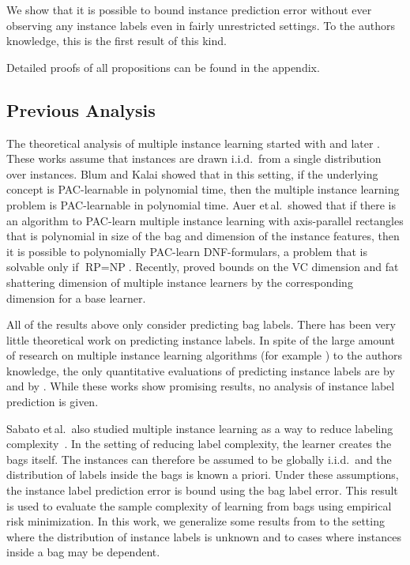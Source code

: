 We show that it is possible to bound instance prediction error without
ever observing any instance labels even in fairly unrestricted settings.
To the authors knowledge, this is the first result of this kind.

Detailed proofs of all propositions can be found in the appendix.

\subsection{Previous Analysis}
The theoretical analysis of multiple instance learning started with \citet{auer1997approximating} and later \citet{blum1998note}.
These works assume that instances are drawn i.i.d.\ from a single distribution over instances. Blum and Kalai showed that in this
setting, if the underlying concept is PAC-learnable in polynomial time, then the multiple instance learning problem is PAC-learnable
in polynomial time. Auer et\,al.\ showed that if there is an algorithm to PAC-learn multiple instance learning with axis-parallel
rectangles that is polynomial in size of the bag and dimension of the instance features, then it is possible to polynomially
PAC-learn DNF-formulars, a problem that is solvable only if $\text{RP}=\text{NP}$.
Recently, \citet{sabato2009homogeneous,DBLP:journals/corr/abs-1107-2021} proved bounds on the VC dimension and
fat shattering dimension of multiple instance learners by the corresponding dimension for a base learner.

All of the results above only consider predicting bag labels. There has been very little theoretical work
on predicting instance labels. In spite of the large amount of research on multiple instance learning algorithms 
(for example \citet{andrews2003support,gaertner2002multi,zhou2009multi,li2009convex,zhang2002dd,mangasarian2008multiple,leistner2010miforests,chen2006miles})
to the authors knowledge, the only quantitative evaluations of predicting
instance labels are by \citet{gehler2007deterministic} and by \citet{liconvex2010}. While these works show promising results,
no analysis of instance label prediction is given.

Sabato et\,al.\ also studied multiple instance learning as a way
to reduce labeling complexity~\citep{sabato2010reducing}.
In the setting of reducing label complexity, the learner creates
the bags itself. The instances can therefore be assumed to be globally i.i.d.\ and
the distribution of labels inside the bags is known a priori.
Under these assumptions, the instance label prediction error is bound using the bag label error.
This result is used to evaluate the sample complexity of learning from bags using empirical risk minimization.
In this work, we generalize some results from \citet{sabato2010reducing} to the setting where the distribution
of instance labels is unknown and to cases where instances inside a bag may be dependent.

